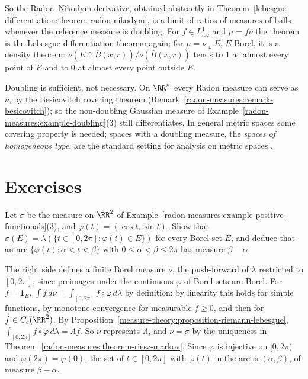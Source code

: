 So the Radon--Nikodym derivative, obtained abstractly in Theorem~\ref{lebesgue-differentiation:theorem-radon-nikodym}, is a limit of ratios of measures of balls whenever the reference measure is doubling. For
$f \in L^1_{\mathrm{loc}}$ and $\mu = f\nu$ the theorem is the Lebesgue differentiation theorem again; for $\mu = \nu\llcorner E$, $E$ Borel, it is a density theorem:
$\nu(E \cap \overline{B}(x, r))/\nu(\overline{B}(x, r))$ tends to $1$ at almost every point of $E$ and to $0$ at almost every point outside $E$.

\begin{remark}\label{radon-measures:remark-doubling}
Doubling is sufficient, not necessary. On $\RR^n$ every Radon measure can serve as $\nu$, by the Besicovitch covering theorem
(Remark~\ref{radon-measures:remark-besicovitch}); so the non-doubling Gaussian measure of Example~\ref{radon-measures:example-doubling}(3)
still differentiates. In general metric spaces some covering property is needed; spaces with a doubling measure, the \emph{spaces of homogeneous type}, are the standard setting for analysis on metric
spaces \cite[Chapter 1]{heinonen-2001}.
\end{remark}

\section{Exercises}\label{radon-measures:section-exercises}

\begin{exercise}\label{radon-measures:exercise-riesz-circle}
Let $\sigma$ be the measure on $\RR^2$ of Example~\ref{radon-measures:example-positive-functionals}(3), and $\varphi(t) = (\cos t, \sin t)$. Show that $\sigma(E) = \lambda(\{t \in [0, 2\pi] : \varphi(t) \in E\})$
for every Borel set $E$, and deduce that an arc $\{\varphi(t) : \alpha < t < \beta\}$ with $0 \leq \alpha < \beta \leq 2\pi$ has measure $\beta - \alpha$.
\end{exercise}

\begin{solution}
The right side defines a finite Borel measure $\nu$, the push-forward of $\lambda$ restricted to $[0, 2\pi]$, since preimages under the continuous $\varphi$ of Borel sets are Borel. For $f = \mathbf{1}_E$,
$\int f\,d\nu = \int_{[0, 2\pi]}f \circ \varphi\,d\lambda$ by definition; by linearity this holds for simple functions, by monotone convergence for measurable $f \geq 0$, and then for $f \in C_c(\RR^2)$. By
Proposition~\ref{measure-theory:proposition-riemann-lebesgue}, $\int_{[0, 2\pi]}f \circ \varphi\,d\lambda = \Lambda f$. So $\nu$ represents $\Lambda$, and $\nu = \sigma$ by the uniqueness in
Theorem~\ref{radon-measures:theorem-riesz-markov}. Since $\varphi$ is injective on $[0, 2\pi)$ and $\varphi(2\pi) = \varphi(0)$, the set of $t \in [0, 2\pi]$ with $\varphi(t)$ in the arc is $(\alpha, \beta)$, of
measure $\beta - \alpha$.
\end{solution}

